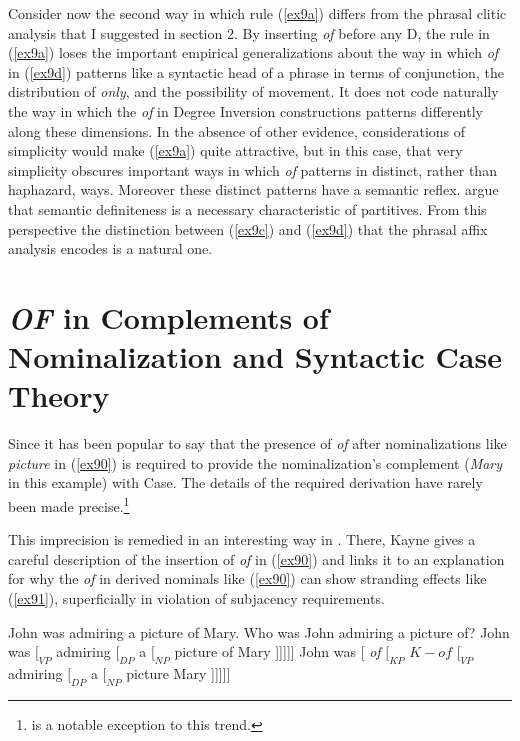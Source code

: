 \documentclass[output=paper,
modfonts
]{LSP/langsci}
\begin{document}
{{{{Consider now the second way in which rule ({\ref{ex9a}}) differs from the phrasal clitic analysis that I suggested in section 2.  By inserting {\textit{of}} before any D, the rule in ({\ref{ex9a}}) loses the important empirical generalizations about the way in which {\textit{of}} in ({\ref{ex9d}}) patterns like a syntactic head of a phrase in terms of conjunction, the distribution of {\textit{only}}, and the possibility of movement.  It does not code naturally the way in which the {\textit{of}} in Degree Inversion constructions patterns differently along these dimensions.  In the absence of other evidence, considerations of simplicity would make ({\ref{ex9a}}) quite attractive, but in this case, that very simplicity obscures important ways in which {\textit{of}} patterns in distinct, rather than haphazard, ways.  Moreover these distinct patterns have a semantic reflex.  {\citet{Peters06}} argue that semantic definiteness is a necessary characteristic of partitives. From this perspective the distinction between ({\ref{ex9c}}) and ({\ref{ex9d}}) that the phrasal affix analysis encodes is a natural one.

 
                 
                
\section{{\textit{OF}} in Complements of Nominalization and Syntactic Case Theory}
Since {\citet{Chomsky81}} it has been popular to say that the presence of {\textit{of}} after nominalizations like {\textit{picture}} in ({\ref{ex90}}) is required to provide the nominalization's complement ({\textit{Mary}} in this example) with Case.  The details of the required derivation have rarely been made precise.{\footnote{{\citet{Harley98}} is a notable exception to this trend.}}} This imprecision is remedied in an interesting way in {\citet{Kayne02}}.  There, Kayne gives a careful description of the insertion of {\textit{of}} in ({\ref{ex90}}) and links it to an explanation for why the {\textit{of}} in derived nominals like ({\ref{ex90}}) can show stranding effects like ({\ref{ex91}}), superficially in violation of subjacency requirements.  

\begin{exe}
\ex\label{ex90}  John was admiring a picture of Mary.
\ex\label{ex91}  Who was John admiring a picture of?
\ex\label{ex92}  John was  $[_{VP} $  admiring $ [_{DP} $ a  $[_{NP} $  picture  of Mary ]]]]]
\ex\label{ex93}  John was [ {\textit{of}} $[_{KP}$ $K-{\textit{of}}$   $[_{VP}$ admiring $[_{DP}$ a $[_{NP}$ picture Mary ]]]]]
\end{exe}

}}}
\end{document}
